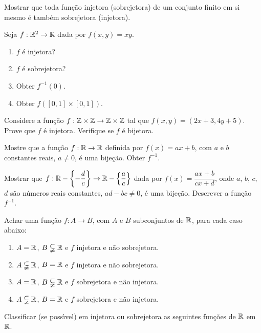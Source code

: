 \documentclass[12pt]{article}
\begin{document}
\vesp

\questao Mostrar que toda fun{\c c}{\~a}o injetora (sobrejetora) de um conjunto finito em si mesmo {\'e} tamb{\'e}m sobrejetora (injetora).

\vesp

\questao Seja $f: \mathbb{R}^2 \to \mathbb{R}$ dada por $f(x,y) = xy$.
\begin{enumerate}[label={\alph*})]
\item $f$ {\'e} injetora?
\item $f$ {\'e} sobrejetora?
\item Obter $f^{-1}({0})$.
\item Obter $f([0,1]\times [0,1])$.
\end{enumerate}

\vesp

\questao Considere a fun{\c c}{\~a}o $f : \mathbb{Z} \times \mathbb{Z} \to \mathbb{Z} \times \mathbb{Z}$ tal que $f(x,y) = (2x + 3, 4y + 5)$. Prove que $f$ {\'e} injetora. Verifique se $f$ {\'e} bijetora.

\vesp

\questao Mostre que a fun{\c c}{\~a}o $f : \mathbb{R} \to \mathbb{R}$ definida por $f(x) = ax + b$, com $a$ e $b$ constantes reais, $a \ne 0$, {\'e} uma bije{\c c}{\~a}o. Obter $f^{-1}$.

\vesp

\questao Mostrar que $f : \mathbb{R} - \left\{-\dfrac{d}{c}\right\} \to \mathbb{R}  - \left\{\dfrac{a}{c}\right\}$ dada por $f(x) =  \dfrac{ax + b}{cx + d}$, onde $a$, $b$, $c$, $d$ s{\~a}o n{\'u}meros reais constantes, $ad - bc \ne 0$, {\'e} uma bije{\c c}{\~a}o. Descrever a fun{\c c}{\~a}o $f^{-1}$.

\vesp

\questao Achar uma fun{\c c}{\~a}o $f : A \to B$, com $A$ e $B$ subconjuntos de $\mathbb{R}$, para cada caso abaixo:
\begin{enumerate}[label={\alph*})]
\item $A = \mathbb{R}$, $B \subsetneqq \mathbb{R}$ e $f$ injetora e n{\~a}o sobrejetora.
\item $A \subsetneqq \mathbb{R}$, $B = \mathbb{R}$ e $f$ injetora e n{\~a}o sobrejetora.
\item $A = \mathbb{R}$, $B \subsetneqq \mathbb{R}$ e $f$ sobrejetora e n{\~a}o injetora.
\item $A \subsetneqq \mathbb{R}$, $B = \mathbb{R}$ e $f$ sobrejetora e n{\~a}o injetora.
\end{enumerate}

\vesp

\questao Classificar (se poss{\'\i}vel) em injetora ou sobrejetora as seguintes fun{\c c}{\~o}es de $\mathbb{R}$ em $\mathbb{R}$.
\end{document}
